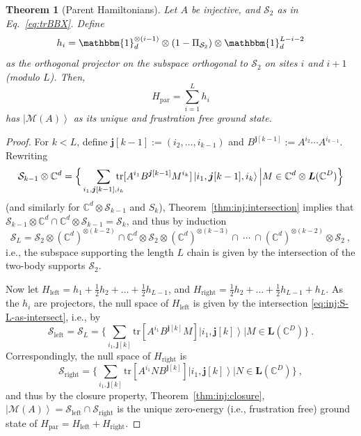 \documentclass{article}
\newcommand{\openone}{\mathbbm{1}}
\newcommand{\ket}[1]{\left|#1\right\rangle}
\newcommand{\tr}{\mathrm{tr}}
\newcommand{\mc}[1]{\mathcal{#1}}
\newcommand{\lin}[1]{{\bm L}(\mathbb C^{#1})}
\theoremstyle{plain}
\newtheorem{theorem}[lemma]{Theorem}
\theoremstyle{definition}
\numberwithin{equation}{section}  %
\begin{document}
\begin{theorem}[Parent Hamiltonians]
    \label{thm:inj:parent-ham}
    Let $A$ be injective, and $\mc S_2$ as in Eq.~\eqref{eq:trBBX}.
    Define
    \[
        h_i=\openone_d^{\otimes(i-1)}\otimes (1-\Pi_{\mathcal S_2})
        \otimes \openone_d^{L-i-2}
    \]
    as the orthogonal projector on the subspace orthogonal to $\mathcal S_2$
    on sites $i$ and $i+1$ (modulo $L$). Then,
    \[
        H_\mathrm{par}=\sum_{i=1}^L h_i
    \]
    has $\ket{{\mathcal{M}}(A)}$ as its unique and frustration free ground state.
\end{theorem}
\begin{proof}
    For $k<L$, define $\bm j[k-1]:=(i_2,\dots,i_{k-1})$ and
    $B^{\bm j[k-1]}:=
        A^{i_2}\cdots A^{i_{k-1}}$. Rewriting
    \[
        \mc S_{k-1}\otimes\mathbb C^d=
        \Big\{\sum_{i_1,\bm j[k-1],i_k}\hspace{-1em}
        \tr[A^{i_1} B^{\bm j[k-1]}M^{i_{k}}]
        \ket{i_1,\bm j[k-1],i_{k}} \Big\vert
        M\in \mathbb{C}^d\otimes\lin D \Big\}
    \]
    (and similarly for $\mathbb C^d\otimes \mc S_{k-1}$ and $S_{k}$),
    Theorem~\ref{thm:inj:intersection} implies that
    $
        \mc S_{k-1}\otimes\mathbb C^d\cap\mathbb C^d\otimes\mc S_{k-1}=\mc S_{k}
    $,
    and thus by induction
    \begin{equation}
        \label{eq:inj:S-L-as-intersect}
        \mathcal S_L = \mc S_2\otimes (\mathbb C^d)^{\otimes (k-2)} \cap
        \mathbb C^d \otimes \mc S_2\otimes (\mathbb C^d)^{\otimes (k-3)} \cap  \
        \cdots \ \cap (\mathbb C^d)^{\otimes (k-2)}\otimes \mathcal S_2\ ,
    \end{equation}
    i.e., the subspace supporting the length $L$ chain is given by the
    intersection of the two-body supports $\mc S_2$.

    Now let $H_\mathrm{left}=h_1+\tfrac12h_2+\dots+\tfrac12h_{L-1}$, and
    $H_\mathrm{right}=\tfrac12h_2+\dots+\tfrac12h_{L-1}+h_L$. As the $h_i$ are
    projectors, the null space of $H_\mathrm{left}$ is given by the intersection
    \eqref{eq:inj:S-L-as-intersect}, i.e., by
    \[
        \mc S_\mathrm{left}=\mc S_L =
        \Big\{\sum_{i_1,\bm j[k]}\tr[A^{i_1} B^{\bm j[k]}M]
        \ket{i_1,\bm j[k]} \Big\vert
        M\in \lin D \Big\}\ .
    \]
    Correspondingly, the null space of $H_\mathrm{right}$ is
    \[
        \mc S_\mathrm{right} =
        \Big\{\sum_{i_1,\bm j[k]}\tr[A^{i_1} N B^{\bm j[k]}]
        \ket{i_1,\bm j[k]} \Big\vert
        N\in \lin D \Big\}\ ,
    \]
    and thus by the closure property, Theorem~\ref{thm:inj:closure},
    $\ket{{\mathcal{M}}(A)}=\mc S_\mathrm{left}\cap \mc S_\mathrm{right}$
    is the unique zero-energy (i.e., frustration free) ground
    state of $H_\mathrm{par}=H_\mathrm{left}+H_\mathrm{right}$.
\end{proof}
\end{document}
